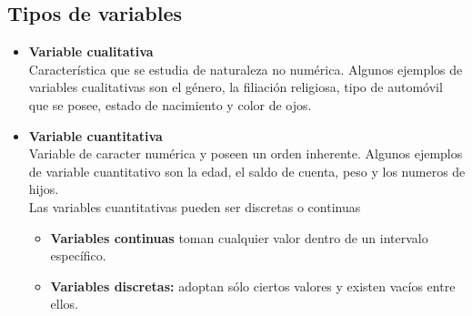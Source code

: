 \documentclass{article}
\begin{document}
\subsection{Tipos de variables}
\begin{itemize}
    \item \textbf{Variable cualitativa}\\
    Característica que se estudia  de naturaleza no numérica.  Algunos ejemplos de variables cualitativas son el género,  la filiación religiosa, tipo de automóvil que se posee, estado de nacimiento y color de ojos.
    \item \textbf{Variable cuantitativa}\\
    Variable de caracter numérica y poseen un orden inherente. Algunos ejemplos de variable cuantitativo son la edad, el saldo de cuenta, peso y los numeros de hijos.\\
    
        Las variables cuantitativas pueden ser discretas o continuas
    
    \begin{itemize}

        \item \textbf{Variables continuas}  toman cualquier valor dentro de un intervalo específico.
        \item \textbf{Variables discretas:} adoptan sólo ciertos valores y existen vacíos entre ellos.
    \end{itemize}
    
\end{itemize}
    
\end{document}
